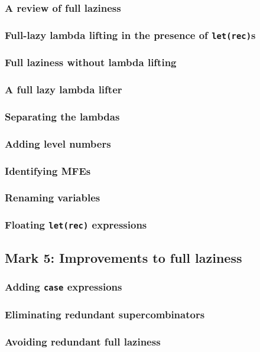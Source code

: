 \documentclass{jarticle}
\begin{document}
\subsubsection{A review of full laziness}
\subsubsection{Full-lazy lambda lifting in the presence of \texttt{let(rec)}s}
\subsubsection{Full laziness without lambda lifting}
\subsubsection{A full lazy lambda lifter}
\subsubsection{Separating the lambdas}
\subsubsection{Adding level numbers}
\subsubsection{Identifying MFEs}
\subsubsection{Renaming variables}
\subsubsection{Floating \texttt{let(rec)} expressions}
\newpage

\subsection{Mark 5: Improvements to full laziness}
\subsubsection{Adding \texttt{case} expressions}
\subsubsection{Eliminating redundant supercombinators}
\subsubsection{Avoiding redundant full laziness}
\newpage
\end{document}

